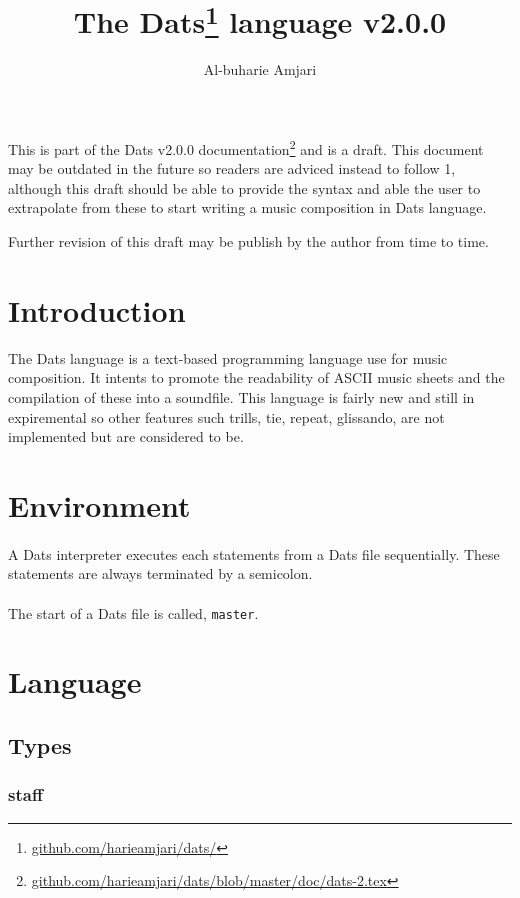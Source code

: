 \documentclass{article}
\title{\textbf{The Dats\thanks{\url{github.com/harieamjari/dats/}} language v2.0.0}}
\author{Al-buharie Amjari}
\begin{document}
\maketitle

\abstract
This is part of the Dats v2.0.0 documentation\footnote{\url{github.com/harieamjari/dats/blob/master/doc/dats-2.tex}} and is a draft. This document may be outdated in the future so readers are adviced instead to follow 1, although this draft should be able to provide the syntax and able the user to extrapolate from these to
start writing a music composition in Dats language.

Further revision of this draft may be publish by the author from time to time.


\section{Introduction}

\indent The Dats language is a text-based programming language use for music composition.  
It intents to promote the readability of ASCII music sheets and the compilation of these into
 a soundfile.
This language is fairly new and still in expiremental so other features such trills, tie,
repeat, glissando, are not implemented but are considered to be.


\section{Environment}
 \paragraph{} A Dats interpreter executes each statements from a Dats file sequentially. These
statements are always terminated by a semicolon.

\paragraph{} The start of a Dats file is called, \verb+master+. 
\section{Language}
\subsection{Types}
\subsubsection{staff}
\end{document}
